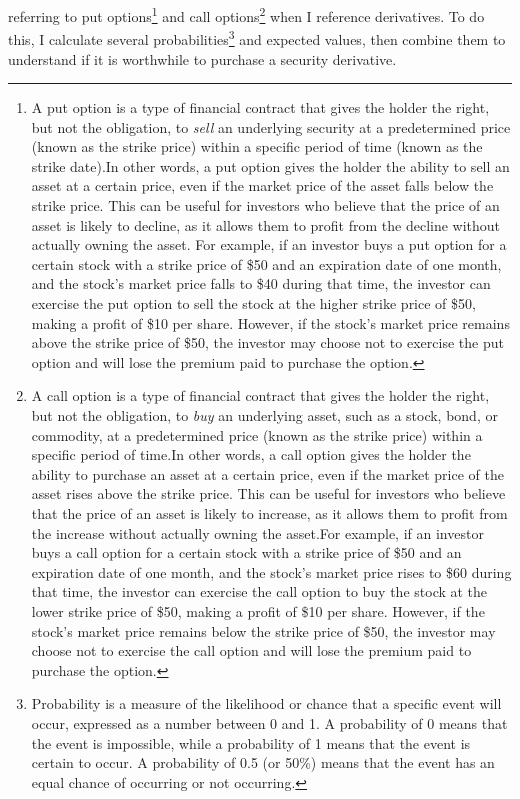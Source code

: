 \documentclass[
]{book}
\begin{document}
referring to put options\footnote{A put option is a type of financial contract that
  gives the holder the right, but not the obligation, to \emph{sell} an underlying
  security at a predetermined price (known as the strike price) within a specific
  period of time (known as the strike date).In other words, a put option
  gives the holder the ability to sell an asset at a certain price, even if the market
  price of the asset falls below the strike price. This can be useful for
  investors who believe that the price of an asset is likely to decline, as it
  allows them to profit from the decline without actually owning the asset.
  For example, if an investor buys a put option for a certain stock with a strike
  price of \$50 and an expiration date of one month, and the stock's market price
  falls to \$40 during that time, the investor can exercise the put option to sell
  the stock at the higher strike price of \$50, making a profit of \$10 per share.
  However, if the stock's market price remains above the strike price of
  \$50, the investor may choose not to exercise the put option and will lose the
  premium paid to purchase the option.} and call options\footnote{A call option is a type
  of financial contract that gives the holder the right, but not the obligation,
  to \emph{buy} an underlying asset, such as a stock, bond, or commodity, at a
  predetermined price (known as the strike price) within a specific period of
  time.In other words, a call option gives the holder the ability to
  purchase an asset at a certain price, even if the market price of the asset
  rises above the strike price. This can be useful for investors who believe that
  the price of an asset is likely to increase, as it allows them to profit from
  the increase without actually owning the asset.For example, if an
  investor buys a call option for a certain stock with a strike price of \$50 and
  an expiration date of one month, and the stock's market price rises to \$60
  during that time, the investor can exercise the call option to buy the stock at
  the lower strike price of \$50, making a profit of \$10 per share.
  However, if the stock's market price remains below the strike price of \$50, the
  investor may choose not to exercise the call option and will lose the premium
  paid to purchase the option.} when I reference derivatives. To do this, I
calculate several probabilities\footnote{Probability is a measure of the likelihood or
  chance that a specific event will occur, expressed as a number between 0 and 1.
  A probability of 0 means that the event is impossible, while a
  probability of 1 means that the event is certain to occur. A probability of
  0.5 (or 50\%) means that the event has an equal chance of occurring or not
  occurring.} and expected values, then combine them to
understand if it is worthwhile to purchase a security derivative.
\end{document}
